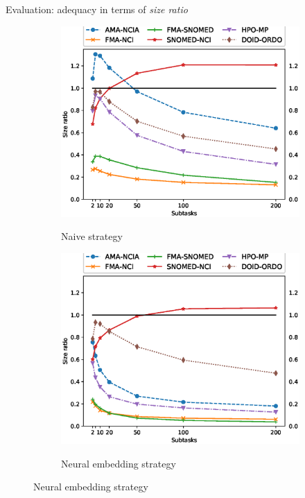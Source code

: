 \documentclass[t]{beamer}
\begin{document}
\begin{frame}{Evaluation: adequacy in terms of \emph{size ratio} }
	
	
	\begin{figure}[t]
    \centering
    \begin{subfigure}[b]{0.495\textwidth}
        \centering
        \includegraphics[width=\textwidth]{figures/ratios.eps}\\[-1ex]
        \caption{Naive strategy}
        \label{fig:ratioN}
    \end{subfigure}
    \begin{subfigure}[b]{0.495\textwidth}
        \centering
        \includegraphics[width=\textwidth]{figures/ratios_advanced.eps}\\[-1ex]
        \caption{Neural embedding strategy}
        \label{fig:ratioA}
    \end{subfigure}
    
\end{figure}
  		
  	
\end{frame}
\end{document}
